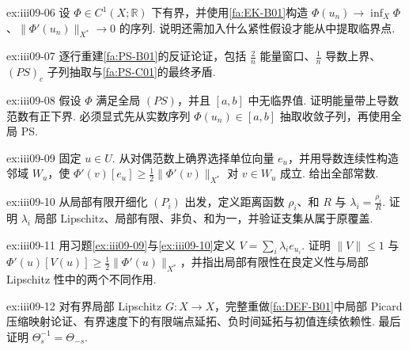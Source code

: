 \begin{FAExercise}[III-08 衔接]{ex:iii09-06}
设 \(\displaystyle\Phi\in C^1(X;\mathbb R)\) 下有界，并使用\autoref{fa:EK-B01}构造 \(\displaystyle\Phi(u_n)\to\inf_X\Phi\)、\(\displaystyle\|\Phi'(u_n)\|_{X^*}\to0\) 的序列. 说明还需加入什么紧性假设才能从中提取临界点.
\end{FAExercise}

\begin{FAExercise}[空临界水平附近的定量梯度下界]{ex:iii09-07}
逐行重建\autoref{fa:PS-B01}的反证论证，包括 \(\displaystyle\frac{2}{n}\) 能量窗口、\(\displaystyle\frac{1}{n}\) 导数上界、\(\displaystyle(PS)_c\) 子列抽取与\autoref{fa:PS-C01}的最终矛盾.
\end{FAExercise}

\begin{FAExercise}[紧能量带]{ex:iii09-08}
假设 \(\displaystyle\Phi\) 满足全局 \(\displaystyle(PS)\)，并且 \(\displaystyle[a,b]\) 中无临界值. 证明能量带上导数范数有正下界. 必须显式先从实数序列 \(\displaystyle\Phi(u_n)\in[a,b]\) 抽取收敛子列，再使用全局 PS.
\end{FAExercise}

\begin{FAExercise}[局部伪梯度方向]{ex:iii09-09}
固定 \(\displaystyle u\in U\). 从对偶范数上确界选择单位向量 \(\displaystyle e_u\)，并用导数连续性构造邻域 \(\displaystyle W_u\)，使 \(\displaystyle\Phi'(v)[e_u]\geqslant\frac{1}{2}\|\Phi'(v)\|_{X^*}\) 对 \(\displaystyle v\in W_u\) 成立. 给出全部常数.
\end{FAExercise}

\begin{FAExercise}{ex:iii09-10}
从局部有限开细化 \(\displaystyle(P_i)\) 出发，定义距离函数 \(\displaystyle\rho_i\)、和 \(\displaystyle R\) 与 \(\displaystyle\lambda_i=\frac{\rho_i}{R}\). 证明 \(\displaystyle\lambda_i\) 局部 Lipschitz、局部有限、非负、和为一，并验证支集从属于原覆盖.
\end{FAExercise}

\begin{FAExercise}[伪梯度估计]{ex:iii09-11}
用习题\ref{ex:iii09-09}与\ref{ex:iii09-10}定义 \(\displaystyle V=\sum_i\lambda_ie_{u_i}\). 证明 \(\displaystyle\|V\|\leqslant1\) 与 \(\displaystyle\Phi'(u)[V(u)]\geqslant\frac{1}{2}\|\Phi'(u)\|_{X^*}\)，并指出局部有限性在良定义性与局部 Lipschitz 性中的两个不同作用.
\end{FAExercise}

\begin{FAExercise}{ex:iii09-12}
对有界局部 Lipschitz \(\displaystyle G:X\to X\)，完整重做\autoref{fa:DEF-B01}中局部 Picard 压缩映射论证、有界速度下的有限端点延拓、负时间延拓与初值连续依赖性. 最后证明 \(\displaystyle\Theta_s^{-1}=\Theta_{-s}\).
\end{FAExercise}

